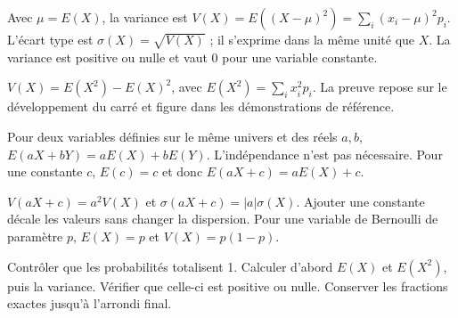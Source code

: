 \clearpage
{}
\begin{definition}
Avec $\mu=E(X)$, la variance est $V(X)=E((X-\mu)^2)=\sum_i(x_i-\mu)^2p_i$.
L'écart type est $\sigma(X)=\sqrt{V(X)}$ ; il s'exprime dans la même unité que $X$.
La variance est positive ou nulle et vaut 0 pour une variable constante.
\end{definition}
\begin{theoreme}
$V(X)=E(X^2)-E(X)^2$, avec $E(X^2)=\sum_i x_i^2p_i$.
La preuve repose sur le développement du carré et figure dans les démonstrations de référence.
\end{theoreme}
\begin{propriete}
Pour deux variables définies sur le même univers et des réels $a,b$,
$E(aX+bY)=aE(X)+bE(Y)$. L'indépendance n'est pas nécessaire.
Pour une constante $c$, $E(c)=c$ et donc $E(aX+c)=aE(X)+c$.
\end{propriete}
\begin{propriete}
$V(aX+c)=a^2V(X)$ et $\sigma(aX+c)=|a|\sigma(X)$.
Ajouter une constante décale les valeurs sans changer la dispersion.
Pour une variable de Bernoulli de paramètre $p$, $E(X)=p$ et $V(X)=p(1-p)$.
\end{propriete}
\begin{savoirfaire}
Contrôler que les probabilités totalisent 1. Calculer d'abord $E(X)$ et $E(X^2)$,
puis la variance. Vérifier que celle-ci est positive ou nulle.
Conserver les fractions exactes jusqu'à l'arrondi final.
\end{savoirfaire}

\exercices

